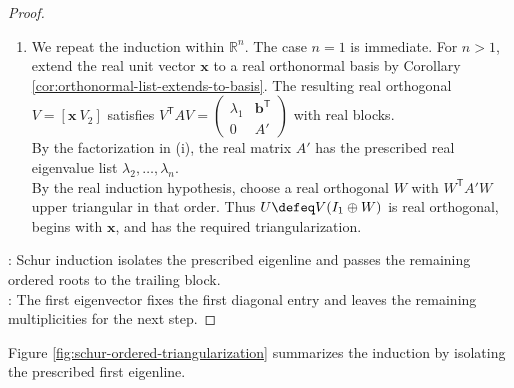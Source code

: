 \begin{theorem}
\begin{proof}
\begin{enumerate}[label=(\roman*)]
\item We repeat the induction within $\mathbb{R}^n$. The case $n=1$ is immediate. For $n>1$, extend the real unit vector $\mathbf{x}$ to a real orthonormal basis by Corollary \ref{cor:orthonormal-list-extends-to-basis}. The resulting real orthogonal $V=[\mathbf{x}\ V_2]$ satisfies $V^{\mathsf{T}}AV=\left(\begin{smallmatrix}\lambda_1&\mathbf{b}^{\mathsf{T}}\\0&A'\end{smallmatrix}\right)$ with real blocks.\\
By the factorization in (i), the real matrix $A'$ has the prescribed real eigenvalue list $\lambda_2,\ldots,\lambda_n$.\\
By the real induction hypothesis, choose a real orthogonal $W$ with $W^{\mathsf{T}}A'W$ upper triangular in that order. Thus $U\defeq V(I_1\oplus W)$ is real orthogonal, begins with $\mathbf{x}$, and has the required triangularization.
\end{enumerate}
: Schur induction isolates the prescribed eigenline and passes the remaining ordered roots to the trailing block.\\
: The first eigenvector fixes the first diagonal entry and leaves the remaining multiplicities for the next step.
\end{proof}
\end{theorem}

Figure \ref{fig:schur-ordered-triangularization} summarizes the induction by isolating the prescribed first eigenline.

\begin{illustrationfigure}[H]
  \centering
  
  \caption{Schur induction: isolate an eigenline, then triangularise the compressed block.}
  \label{fig:schur-ordered-triangularization}
\end{illustrationfigure}


